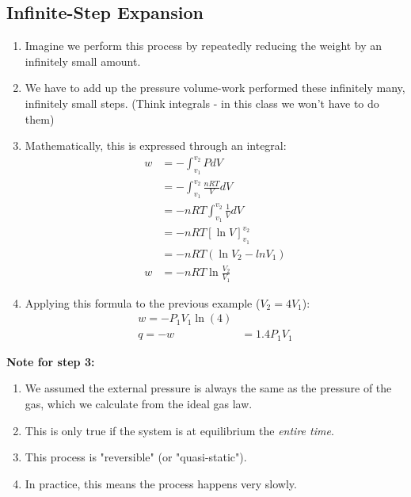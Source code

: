 \documentclass{article}  %
\begin{document}
\subsection*{Infinite-Step Expansion}
\begin{enumerate}
    \item Imagine we perform this process by repeatedly reducing the weight by an infinitely small amount.
    \item We have to add up the pressure volume-work performed these infinitely many, infinitely small steps. (Think integrals - in this class we won't have to do them) 
    \item Mathematically, this is expressed through an integral:
        \begin{equation*}
            \begin{aligned}
                w &= -\int ^{v_2}_{v_1} P dV \\
                &= -\int ^{v_2}_{v_1} \frac{nRT}{V} dV \\
                &= -nRT \int ^{v_2}_{v_1} \frac{1}{V} dV \\
                &= -nRT [\ln V]^{v_2}_{v_1} \\
                &= -nRT(\ln V_2 - ln V_1) \\
                w &= -nRT \ln \frac{V_2}{V_1}
            \end{aligned}
        \end{equation*}
    \item Applying this formula to the previous example ($V_2 = 4V_1$):
        \begin{equation*}
            \begin{aligned}
                w = -P_1 V_1 \ln(4) \\
                q = -w &= 1.4P_1 V_1 
            \end{aligned}
        \end{equation*}
\end{enumerate}
\textbf{Note for step 3:}
\begin{enumerate}
    \item We assumed the external pressure is always the same as the pressure of the gas, which we calculate from the ideal gas law. 
    \item This is only true if the system is at equilibrium the \emph{entire time}.
    \item This process is "reversible" (or "quasi-static").
    \item In practice, this means the process happens very slowly. 
\end{enumerate}
\end{document}

